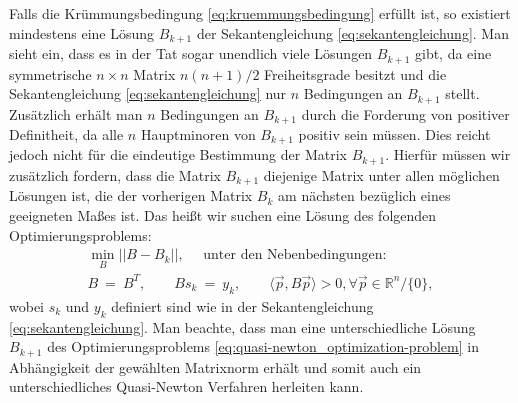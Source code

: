 Falls die Krümmungsbedingung \eqref{eq:kruemmungsbedingung} erfüllt ist, so existiert mindestens eine Lösung $B_{k+1}$ der Sekantengleichung \eqref{eq:sekantengleichung}.
Man sieht ein, dass es in der Tat sogar unendlich viele Lösungen $B_{k+1}$ gibt, da eine symmetrische $n \times n$ Matrix $n(n+1)/2$ Freiheitsgrade besitzt und die Sekantengleichung \eqref{eq:sekantengleichung} nur $n$ Bedingungen an $B_{k+1}$ stellt.
Zusätzlich erhält man $n$ Bedingungen an $B_{k+1}$ durch die Forderung von positiver Definitheit, da alle $n$ Hauptminoren von $B_{k+1}$ positiv sein müssen.
Dies reicht jedoch nicht für die eindeutige Bestimmung der Matrix $B_{k+1}$.
Hierfür müssen wir zusätzlich fordern, dass die Matrix $B_{k+1}$ diejenige Matrix unter allen möglichen Lösungen ist, die der vorherigen Matrix $B_k$ am nächsten bezüglich eines geeigneten Maßes ist.
Das heißt wir suchen eine Lösung des folgenden Optimierungsproblems:
\begin{equation}
\label{eq:quasi-newton_optimization-problem}
\begin{split}
\min_{B} || B - B_k ||, \quad \text{ unter den Nebenbedingungen: } \\
B \ = \ B^T, \qquad B s_k \ = \ y_k, \qquad \langle \vec{p}, B\vec{p} \rangle > 0, \forall \vec{p} \in \mathbb{R}^n / \lbrace 0 \rbrace,
\end{split}
\end{equation}
wobei $s_k$ und $y_k$ definiert sind wie in der Sekantengleichung \eqref{eq:sekantengleichung}.
Man beachte, dass man eine unterschiedliche Lösung $B_{k+1}$ des Optimierungsproblems \eqref{eq:quasi-newton_optimization-problem} in Abhängigkeit der gewählten Matrixnorm erhält und somit auch ein unterschiedliches Quasi-Newton Verfahren herleiten kann.

